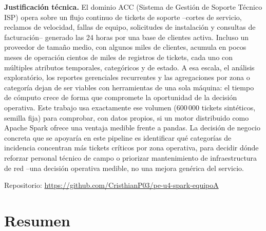 \documentclass[11pt,a4paper]{article}
\begin{document}
\begin{titlepage}
\vspace{0.8cm}
\begin{minipage}{0.92\textwidth}
\textbf{Justificaci\'on t\'ecnica.} El dominio ACC (Sistema de Gesti\'on de Soporte
T\'ecnico ISP) opera sobre un flujo continuo de tickets de soporte --cortes de
servicio, reclamos de velocidad, fallas de equipo, solicitudes de instalaci\'on
y consultas de facturaci\'on-- generado las 24 horas por una base de clientes
activa. Incluso un proveedor de tama\~no medio, con algunos miles de clientes,
acumula en pocos meses de operaci\'on cientos de miles de registros de
tickets, cada uno con m\'ultiples atributos temporales, categ\'oricos y de
estado. A esa escala, el an\'alisis explorat\'orio, los reportes gerenciales
recurrentes y las agregaciones por zona o categor\'ia dejan de ser viables con
herramientas de una sola m\'aquina: el tiempo de c\'omputo crece de forma que
compromete la oportunidad de la decisi\'on operativa. Este trabajo usa
exactamente ese volumen (600\,000 tickets sint\'eticos, semilla fija) para
comprobar, con datos propios, si un motor distribuido como Apache Spark ofrece
una ventaja medible frente a pandas. La decisi\'on de negocio concreta que se
apoyar\'ia en este pipeline es identificar qu\'e categor\'ias de incidencia
concentran m\'as tickets cr\'iticos por zona operativa, para decidir d\'onde
reforzar personal t\'ecnico de campo o priorizar mantenimiento de
infraestructura de red --una decisi\'on operativa medible, no una mejora
gen\'erica del servicio.
\end{minipage}

\vfill
{\small Repositorio: \url{https://github.com/CristhianP03/pe-u4-spark-equipoA}\par}
\end{titlepage}

\tableofcontents
\newpage

\section*{Resumen}
\end{document}

